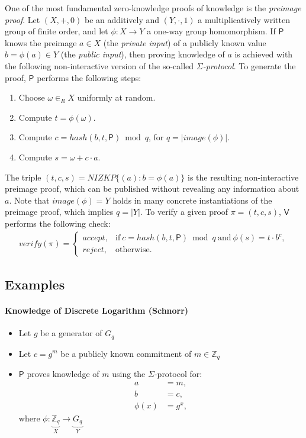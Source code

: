 \documentclass[bibtotoc,halfparskip,oneside]{scrreprt}
\newcommand{\Prover}{\ensuremath{\mathsf{P}}\xspace}
\newcommand{\Verifier}{\ensuremath{\mathsf{V}}\xspace}
\begin{document}
One of the most fundamental zero-knowledge proofs of knowledge is the \emph{preimage proof}. Let $(X,+,0)$ be an additively and $(Y,\cdot,1)$ a multiplicatively written group of finite order, and let $\phi:X\rightarrow Y$ a one-way group homomorphism. If $\Prover$ knows the preimage $a\in X$ (the \emph{private input}) of a publicly known value $b=\phi(a)\in Y$ (the \emph{public input}), then proving knowledge of $a$ is achieved with the following non-interactive version of the so-called \emph{$\Sigma$-protocol}. To generate the proof, $\Prover$ performs the following steps:
\begin{enumerate}
	\item Choose $\omega\in_R X$ uniformly at random.
	\item Compute $t=\phi(\omega)$.
	\item Compute $c = \mathit{hash}(b,t,\Prover) \bmod{q}$, for $q=|\mathit{image}(\phi)|$.
	\item Compute $s = \omega + c\cdot a$.
\end{enumerate}
The triple $(t,c,s)=\mathit{NIZKP}\{(a):b=\phi(a)\}$ is the resulting non-interactive preimage proof, which can be published without revealing any information about $a$. Note that $\mathit{image}(\phi)=Y$ holds in many concrete instantiations of the  preimage proof, which implies $q=|Y|$. To verify a given proof $\pi=(t,c,s)$, $\Verifier$ performs the following check:
\begin{align}
	\mathit{verify}(\pi)=\begin{cases}
	\mathit{accept}, & \text{if}~ c = \mathit{hash}(b,t,\Prover) \bmod{q} ~\text{and}~\phi(s)=t\cdot b^c,\\
	\mathit{reject}, & \text{otherwise}.
	\end{cases}
\end{align}


\subsection{Examples}

\paragraph*{Knowledge of Discrete Logarithm (Schnorr)}
	\begin{itemize}
		\item Let $g$ be a generator of $G_q$
		\item Let $c=g^m $ be a publicly known commitment of $m\in\mathbb{Z}_q$ 
		\item $\Prover$ proves knowledge of $m$ using the $\Sigma$-protocol for:
		\begin{align*}
			 a &= m,\\
			 b &= c,\\
			 \phi(x)&=g^x,
		\end{align*}
		where $\phi:\underbrace{\mathbb{Z}_q}_X\rightarrow \underbrace{G_q}_Y$
	\end{itemize}
\end{document}
